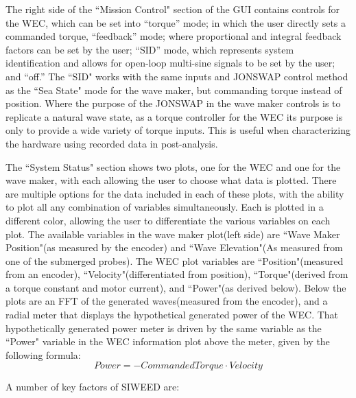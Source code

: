 \documentclass[11pt, letterpaper]{article}
\begin{document}
The right side of the ``Mission Control" section of the GUI  contains controls for the WEC, which can be set into ``torque'' mode; in which the user directly sets a commanded torque, ``feedback'' mode; where proportional and integral feedback factors can be set by the user; ``SID'' mode, which represents system identification and allows for open-loop multi-sine signals to be set by the user; and ``off.''
The ``SID" works with the same inputs and JONSWAP control method as the ``Sea State" mode for the wave maker, but commanding torque instead of position.
Where the purpose of the JONSWAP in the wave maker controls is to replicate a natural wave state, as a torque controller for the WEC its purpose is only to provide a wide variety of torque inputs. 
This is useful when characterizing the hardware using recorded data in post-analysis.

The ``System Status" section shows two plots, one for the WEC and one for the wave maker, with each allowing the user to choose what data is plotted. 
There are multiple options for the data included in each of these plots, with the ability to plot all any combination of variables simultaneously.
Each is plotted in a different color, allowing the user to differentiate the various variables on each plot.
The available variables in the wave maker plot(left side) are ``Wave Maker Position"(as measured by the encoder) and ``Wave Elevation"(As measured from one of the submerged probes).
The WEC plot variables are ``Position"(measured from an encoder), ``Velocity"(differentiated from position), ``Torque"(derived from a torque constant and motor current), and ``Power"(as derived below).
Below the plots are an FFT of the generated waves(measured from the encoder), and a radial meter that displays the hypothetical generated power of the WEC.
That hypothetically generated power meter is driven by the same variable as the ``Power" variable in the WEC information plot above the meter, given by the following formula:
\begin{equation}
  Power = -Commanded Torque \cdot Velocity
\end{equation}


A number of key factors of SIWEED are:
\end{document}
